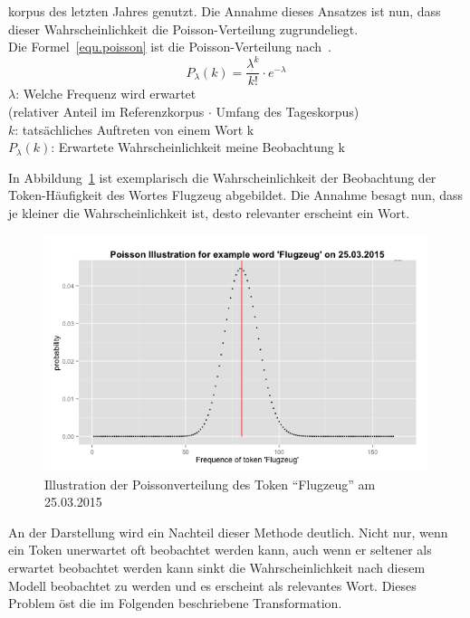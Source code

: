 korpus des letzten Jahres genutzt. Die Annahme dieses Ansatzes ist nun, dass dieser Wahrscheinlichkeit die Poisson-Verteilung zugrundeliegt.\\
Die Formel~\ref{equ.poisson} ist die Poisson-Verteilung nach~\cite[S. 338 ff]{heyer06}.
	\begin{equation}\label{equ.poisson}
	P_\lambda(k) = \frac{\lambda^{k}}{k!}  \cdot e^{-\lambda}
	\end{equation}
	$\lambda$: Welche Frequenz wird erwartet \\
	(relativer Anteil im Referenzkorpus $\cdot$ Umfang des Tageskorpus)\\
	$k$: tatsächliches Auftreten von einem Wort k\\
	$P_\lambda(k)$: Erwartete Wahrscheinlichkeit meine Beobachtung k


In Abbildung~\ref{pic.poisson_algemein} ist exemplarisch die Wahrscheinlichkeit der Beobachtung der Token-Häufigkeit des Wortes Flugzeug abgebildet. Die Annahme besagt nun, dass je kleiner die Wahrscheinlichkeit
ist, desto relevanter erscheint ein Wort. \\

\begin{figure}[h!]
    \centering
    \includegraphics[width=1\textwidth]{pictures/poissonVerteilungFlugzeug.png}
    \caption{Illustration der Poissonverteilung des Token \enquote{Flugzeug} am 25.03.2015}\label{pic.poisson_algemein}
\end{figure}

An der Darstellung wird ein Nachteil dieser Methode deutlich. Nicht nur, wenn ein Token unerwartet oft beobachtet werden kann, auch wenn er seltener als erwartet beobachtet werden kann sinkt die Wahrscheinlichkeit nach diesem Modell beobachtet zu werden und es erscheint als relevantes Wort. Dieses Problem öst die im Folgenden beschriebene Transformation.\\

